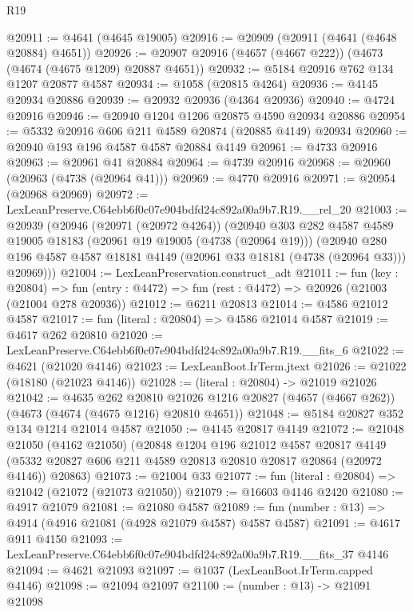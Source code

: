 \begin{lexlean}{R19}
\begin{coremodule}
@20911 := @4641 (@4645 @19005)
@20916 := @20909 (@20911 (@4641 (@4648 @20884) @4651))
@20926 := @20907 @20916 (@4657 (@4667 @222)) (@4673 (@4674 (@4675 @1209) @20887 @4651))
@20932 := @5184 @20916 @762 @134 @1207 @20877 @4587
@20934 := @1058 (@20815 @4264)
@20936 := @4145 @20934 @20886
@20939 := @20932 @20936 (@4364 @20936)
@20940 := @4724 @20916
@20946 := @20940 @1204 @1206 @20875 @4590 @20934 @20886
@20954 := @5332 @20916 @606 @211 @4589 @20874 (@20885 @4149) @20934
@20960 := @20940 @193 @196 @4587 @4587 @20884 @4149
@20961 := @4733 @20916
@20963 := @20961 @41 @20884
@20964 := @4739 @20916
@20968 := @20960 (@20963 (@4738 (@20964 @41)))
@20969 := @4770 @20916
@20971 := @20954 (@20968 @20969)
@20972 := LexLeanPreserve.C64ebb6f0c07e904bdfd24c892a00a9b7.R19.__rel_20
@21003 := @20939
    (@20946
      (@20971 (@20972 @4264))
      (@20940
        @303
        @282
        @4587
        @4589
        @19005
        @18183
        (@20961 @19 @19005 (@4738 (@20964 @19)))
        (@20940
          @280
          @196
          @4587
          @4587
          @18181
          @4149
          (@20961 @33 @18181 (@4738 (@20964 @33)))
          @20969)))
@21004 := LexLeanPreservation.construct_adt
@21011 := fun (key : @20804) =>
  fun (entry : @4472) => fun (rest : @4472) => @20926 (@21003 (@21004 @278 @20936))
@21012 := @6211 @20813
@21014 := @4586 @21012 @4587
@21017 := fun (literal : @20804) => @4586 @21014 @4587
@21019 := @4617 @262 @20810
@21020 := LexLeanPreserve.C64ebb6f0c07e904bdfd24c892a00a9b7.R19.__fits_6
@21022 := @4621 (@21020 @4146)
@21023 := LexLeanBoot.IrTerm.jtext
@21026 := @21022 (@18180 (@21023 @4146))
@21028 := (literal : @20804) -> @21019 @21026
@21042 := @4635
    @262
    @20810
    @21026
    @1216
    @20827
    (@4657 (@4667 @262))
    (@4673 (@4674 (@4675 @1216) @20810 @4651))
@21048 := @5184 @20827 @352 @134 @1214 @21014 @4587
@21050 := @4145 @20817 @4149
@21072 := @21048
    @21050
    (@4162 @21050)
    (@20848
      @1204
      @196
      @21012
      @4587
      @20817
      @4149
      (@5332 @20827 @606 @211 @4589 @20813 @20810 @20817 @20864 (@20972 @4146))
      @20863)
@21073 := @21004 @33
@21077 := fun (literal : @20804) => @21042 (@21072 (@21073 @21050))
@21079 := @16603 @4146 @2420
@21080 := @4917 @21079
@21081 := @21080 @4587
@21089 := fun (number : @13) => @4914 (@4916 @21081 (@4928 @21079 @4587) @4587 @4587)
@21091 := @4617 @911 @4150
@21093 := LexLeanPreserve.C64ebb6f0c07e904bdfd24c892a00a9b7.R19.__fits_37 @4146
@21094 := @4621 @21093
@21097 := @1037 (LexLeanBoot.IrTerm.capped @4146)
@21098 := @21094 @21097
@21100 := (number : @13) -> @21091 @21098

\end{coremodule}
\end{lexlean}
